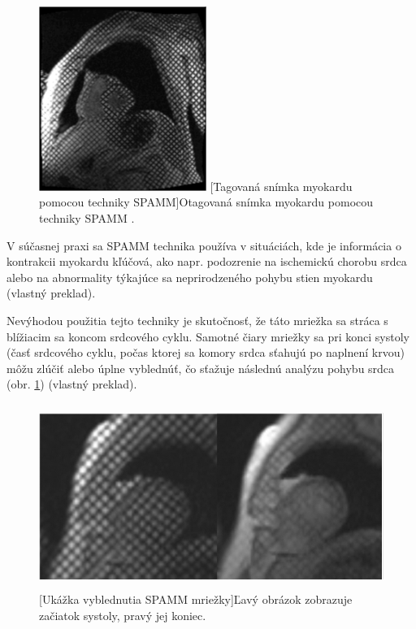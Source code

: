 \begin {figure}[H]
        \centering
        \includegraphics[height=6cm]{media/heart/tagged_heart.png}
        \captionsetup{justification=centering}
        [Tagovaná snímka myokardu pomocou techniky SPAMM]{Otagovaná snímka myokardu pomocou techniky SPAMM \cite{spamm_description}.}
\end {figure}

V súčasnej praxi sa SPAMM technika používa v situáciách, kde je informácia o kontrakcii myokardu kľúčová, ako napr. podozrenie na ischemickú chorobu srdca alebo na abnormality týkajúce sa neprirodzeného pohybu stien myokardu \cite{spamm_description} (vlastný preklad).

Nevýhodou použitia tejto techniky je skutočnosť, že táto mriežka sa stráca s blížiacim sa koncom srdcového cyklu. Samotné čiary mriežky sa pri konci systoly (časť srdcového cyklu, počas ktorej sa komory srdca sťahujú po naplnení krvou) môžu zlúčiť alebo úplne vyblednúť, čo sťažuje následnú analýzu pohybu srdca (obr. \ref{fig:grid_dimishing}) \cite{spamm_description} (vlastný preklad).

\begin {figure}[H]
        \centering
        \includegraphics[height=6cm]{media/heart/early_late_systole.png}
        \captionsetup{justification=centering}
        [Ukážka vyblednutia SPAMM mriežky]{Ľavý obrázok zobrazuje začiatok systoly, pravý jej koniec.}
        \label{fig:grid_dimishing}
\end {figure}

\clearpage
